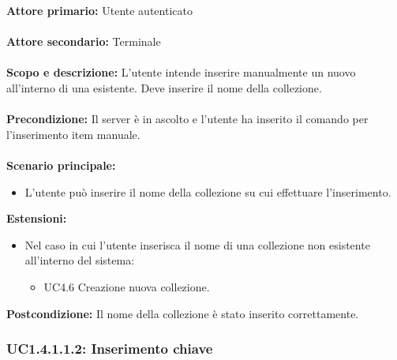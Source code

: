 \documentclass{scalatekids-article}
\begin{document}
\textbf{Attore primario:} Utente autenticato\\ \\
\textbf{Attore secondario:} Terminale\\ \\
\textbf{Scopo e descrizione:} L'utente intende inserire manualmente un nuovo  all'interno di una  esistente. Deve inserire il nome della collezione.\\ \\
\textbf{Precondizione:} Il server è in ascolto e l'utente ha inserito il comando per l'inserimento item manuale.\\ \\
\textbf{Scenario principale:}
\begin{itemize}
  \item L'utente può inserire il nome della collezione su cui effettuare l'inserimento.
\end{itemize}
\textbf{Estensioni:}
\begin{itemize}
  \item Nel caso in cui l'utente inserisca il nome di una collezione non esistente all'interno del sistema:
  \begin{itemize}
    \item UC4.6 Creazione nuova collezione. %
  \end{itemize}
\end{itemize}
\textbf{Postcondizione:} Il nome della collezione è stato inserito correttamente.

\subsubsection{UC1.4.1.1.2: Inserimento chiave}
\end{document}
